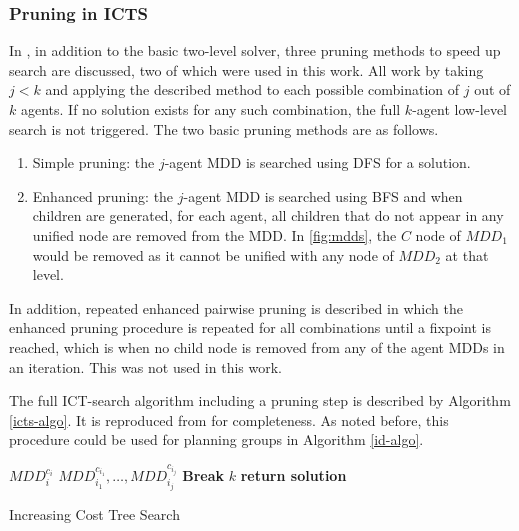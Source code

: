 \documentclass[english]{article}
\begin{document}
	\subsubsection{Pruning in ICTS}
	\label{pruning}
	In \cite{sharon2011}, in addition to the basic two-level solver, three pruning methods to speed up search are discussed, two of which were used in this work. All work by taking $j < k$ and applying the described method to each possible combination of $j$ out of $k$ agents. If no solution exists for any such combination, the full $k$-agent low-level search is not triggered. The two basic pruning methods are as follows.
	\begin{enumerate}
		\item Simple pruning: the $j$-agent MDD is searched using DFS for a solution.
		\item Enhanced pruning: the $j$-agent MDD is searched using BFS and when children are generated, for each agent, all children that do not appear in any unified node are removed from the MDD. In \ref{fig:mdds}, the $C$ node of $MDD_1$ would be removed as it cannot be unified with any node of $MDD_2$ at that level. 
	\end{enumerate}
	In addition, repeated enhanced pairwise pruning is described in which the enhanced pruning procedure is repeated for all combinations until a fixpoint is reached, which is when no child node is removed from any of the agent MDDs in an iteration. This was not used in this work. 
	
	The full ICT-search algorithm including a pruning step is described by Algorithm \ref{icts-algo}. It is reproduced from \cite{sharon2011} for completeness. As noted before, this procedure could be used for planning groups in Algorithm \ref{id-algo}. 
	\begin{algorithm}
		\begin{algorithmic}[1]
			\State {}
			 $MDD_i^{c_i}$
			\EndFor
			\State {}$MDD_{i_1}^{c_{i_1}},\ldots,MDD_{i_j}^{c_{i_j}}$
			\State \textbf{Break}
			\EndIf
			\EndFor
			\State {}$k$
			\State \textbf{return solution}
			\EndIf
			\EndFor
			
			\EndProcedure
		\end{algorithmic}
		\caption{Increasing Cost Tree Search}
		\label{icts-algo}
	\end{algorithm}
\end{document}
